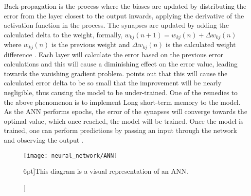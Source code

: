 Back-propagation is the process where the biases are updated by distributing the error from the layer closest to the output inwards, applying the derivative of the activation function in the process. The synapses are updated by adding the calculated delta to the weight, formally, $w_{kj}(n+1) = w_{kj}(n) + \Delta w_{kj}(n)$ where $w_{kj}(n)$ is the previous weight and $\Delta w_{kj}(n)$ is the calculated weight difference \citep{Rosen:1994:THL:326619.326741}. Each layer will calculate the error based on the previous error calculations and this will cause a diminishing effect on the error value, leading towards the vanishing gradient problem. \citet{Hochreiter:1998:VGP:353515.355233} points out that this will cause the calculated error delta to be so small that the improvement will be nearly negligible, thus causing the model to be under-trained. One of the remedies to the above phenomenon is to implement Long short-term memory to the model. As the ANN performs epochs, the error of the synapses will converge towards the optimal value, which once reached, the model will be trained. Once the model is trained, one can perform predictions by passing an input through the network and observing the output \citep{Tasdemir:2008:PSR:1500879.1500925}.
\begin{figure}
	\begin{center}
		
	
	\texttt{[image: neural\_network/ANN]}
	\caption[ANN][6pt]{This diagram is a visual representation of an ANN.}
	\label{fig:annfig}
\end{center}
\end{figure}

